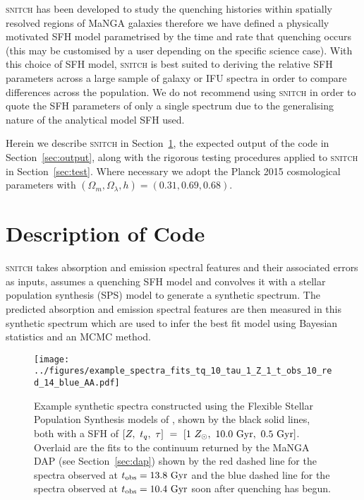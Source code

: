 \documentclass[useAMS,usenatbib]{mn2e}
\begin{document}
\textsc{snitch} has been developed to study the quenching histories within spatially resolved regions of MaNGA galaxies therefore we have defined a physically motivated SFH model parametrised by the time and rate that quenching occurs (this may be customised by a user depending on the specific science case). With this choice of SFH model, \textsc{snitch} is best suited to deriving the relative SFH parameters across a large sample of galaxy or IFU spectra in order to compare differences across the population. We do not recommend using \textsc{snitch} in order to quote the SFH parameters of only a single spectrum due to the generalising nature of the analytical model SFH used.  



Herein we describe \textsc{snitch} in Section~\ref{sec:code}, the expected output of the code in Section~\ref{sec:output}, along with the rigorous testing procedures applied to \textsc{snitch} in Section~\ref{sec:test}. Where necessary we adopt the Planck 2015 \citep{planck16} cosmological parameters with $(\Omega_m, \Omega_{\lambda}, h) = (0.31, 0.69, 0.68)$. 

\section{Description of Code}\label{sec:code}

\textsc{snitch} takes absorption and emission spectral features and their associated errors as inputs, assumes a quenching SFH model and convolves it with a stellar population synthesis (SPS) model to generate a synthetic spectrum. The predicted absorption and emission spectral features are then measured in this synthetic spectrum which are used to infer the best fit model using Bayesian statistics and an MCMC method. 

\begin{figure*}
\centering
\texttt{[image: ../figures/example\_spectra\_fits\_tq\_10\_tau\_1\_Z\_1\_t\_obs\_10\_red\_14\_blue\_AA.pdf]}
\caption{Example synthetic spectra constructed using the Flexible Stellar Population Synthesis models of \citeauthor[][see Section~\ref{sec:fsps}]{conroy09}, shown by the black solid lines, both with a SFH of $[Z,~t_q,~\tau]~=~[1~Z_{\odot},~10.0~\rm{Gyr},~0.5~\rm{Gyr}]$. Overlaid are the fits to the continuum returned by the MaNGA DAP (see Section~\ref{sec:dap}) shown by the red dashed line for the spectra observed at $t_{\rm{obs}} = 13.8~\rm{Gyr}$ and the blue dashed line for the spectra observed at $t_{\rm{obs}} = 10.4~\rm{Gyr}$ soon after quenching has begun.}
\label{fig:spectrafit}
\end{figure*}
\end{document}
